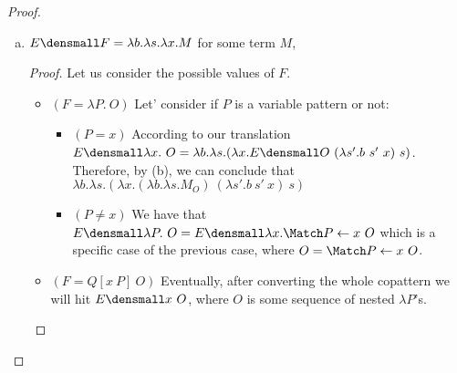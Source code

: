 \begin{proof}
\begin{enumerate}[(a)]
\begin{proof}
\begin{itemize}
\begin{align*}
\begin{aligned}[t]
\begin{aligned}[t]
                \_ &\to b~s
                ~\}
              \end{aligned}
            \end{aligned}  & (IH)
            \end{align*}
    \item $(O = \Nest O)$
        \begin{align*}
            & \quad E\den{\Nest O} = \lambda b. \lambda s. \Rec s' = E\den{O} ~ (\lambda \_. b ~ s) ~ (\lambda x. s' ~ x)\\
            =& \quad \lambda b. \lambda s. \Rec s' = (\lambda b. \lambda s.~ M_O) ~ (\lambda \_. b ~ s) ~ (\lambda x. s' ~ x) & (IH)
        \end{align*}
    \item $(O = \Try x \to B)$ 
        \begin{align*}
            & \quad E\den{\Try x \to B} = \lambda x. T\den{B}\\
            =& \quad \lambda x. (\lambda s.~ M_B) & (a) \\
            =& \quad \lambda b. (\lambda s.~ M_B)\subst{x}{b} & (=_{\alpha})
        \end{align*}
    \end{itemize}
    \qed
\end{proof}
\item $E\den{F} = \lambda b. \lambda s. \lambda x. M$ for some term $M$,
\begin{proof}
    Let us consider the possible values of $F$.
    \begin{itemize}
        \item $(F= \lambda P. ~O)$ Let' consider if $P$ is a variable pattern or not:
        \begin{itemize}
            \item $(P = x)$ According to our translation $E\den{\lambda x. ~O}=\lambda b. \lambda s. (\lambda x. E\den{O} ~ (\lambda s'. b ~ s' ~ x) ~ s)$.
            Therefore, by (b), we can conclude that $\lambda b. \lambda s. (\lambda x. (\lambda b. \lambda s. M_O) ~ (\lambda s'. b ~ s' ~ x) ~ s)$
            \item $(P \neq x)$ We have that $E\den{\lambda P. ~O}=E\den{\lambda x. \Match P \gets x ~ O}$ which is a specific case of the previous case, where $O=\Match P \gets x ~ O$.
        \end{itemize} 
        \item $(F= Q[x ~P] ~O)$ Eventually, after converting the whole copattern we will hit $E\den{x ~O}$, where $O$ is some sequence of nested $\lambda P$'s.

\end{itemize}
\end{proof}
\end{enumerate}
\end{proof}
